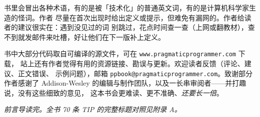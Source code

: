
\begin{ideabox}
书里会冒出各种术语，有的是被「技术化」的普通英文词，有的是计算机科学家生造的怪词。作者
尽量在首次出现时给出定义或提示，但难免有漏网的。作者给读者的建议很实在：遇到没见过的词
别跳过，花点时间查一查（上网或翻教材），查不到就发邮件来吐槽，好让他们在下一版补上定义。
\end{ideabox}



\begin{ideabox}
书中大部分代码取自可编译的源文件，可在 \texttt{www.pragmaticprogrammer.com} 下载，
站上还有作者觉得有用的资源链接、勘误与更新。欢迎读者反馈（评论、建议、正文错误、
示例问题），邮箱 \texttt{ppbook@pragmaticprogrammer.com}。致谢部分作者感谢了
Addison-Wesley 的编辑与制作团队，以及一长串审阅者——并打趣说，没有这些细致的意见，
这本书会更难读、更不准确、\emph{还要长一倍}。
\end{ideabox}

\vspace{0.6em}
\begin{center}
\small\itshape\color{ppgray}
前言导读完。全书 70 条 TIP 的完整标题对照见附录 A。
\end{center}
